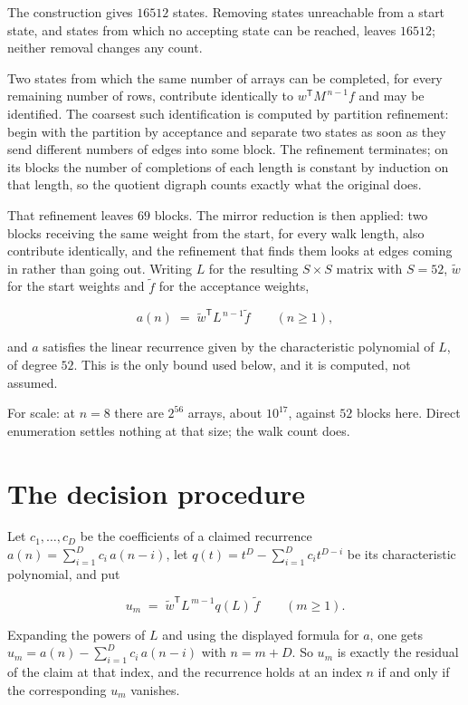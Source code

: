 \documentclass[11pt]{article}
\theoremstyle{definition}
\begin{document}
The construction gives $16512$ states. Removing states unreachable from a start state, and states from which no accepting state can be reached, leaves $16512$; neither removal changes any count.

Two states from which the same number of arrays can be completed, for every remaining number of rows, contribute identically to $w^{\mathsf T}M^{\,n-1}f$ and may be identified. The coarsest such identification is computed by partition refinement: begin with the partition by acceptance and separate two states as soon as they send different numbers of edges into some block. The refinement terminates; on its blocks the number of completions of each length is constant by induction on that length, so the quotient digraph counts exactly what the original does.

That refinement leaves $69$ blocks. The mirror reduction is then applied: two blocks receiving the same weight from the start, for every walk length, also contribute identically, and the refinement that finds them looks at edges coming in rather than going out. Writing $L$ for the resulting $S \times S$ matrix with $S = 52$, $\tilde w$ for the start weights and $\tilde f$ for the acceptance weights,

\[a(n) \;=\; \tilde w^{\mathsf T} L^{\,n-1} \tilde f \qquad (n \ge 1),\]

and $a$ satisfies the linear recurrence given by the characteristic polynomial of $L$, of degree $52$. This is the only bound used below, and it is computed, not assumed.

For scale: at $n = 8$ there are $2^{56}$ arrays, about $10^{17}$, against $52$ blocks here. Direct enumeration settles nothing at that size; the walk count does.

\section{The decision procedure}

Let $c_1,\dots,c_D$ be the coefficients of a claimed recurrence $a(n) = \sum_{i=1}^{D} c_i\,a(n-i)$, let $q(t) = t^{D} - \sum_{i=1}^{D} c_i t^{D-i}$ be its characteristic polynomial, and put

\[u_m \;=\; \tilde w^{\mathsf T} L^{\,m-1} q(L)\,\tilde f \qquad (m \ge 1).\]

Expanding the powers of $L$ and using the displayed formula for $a$, one gets $u_m = a(n) - \sum_{i=1}^{D} c_i\,a(n-i)$ with $n = m + D$. So $u_m$ is exactly the residual of the claim at that index, and the recurrence holds at an index $n$ if and only if the corresponding $u_m$ vanishes.
\end{document}
